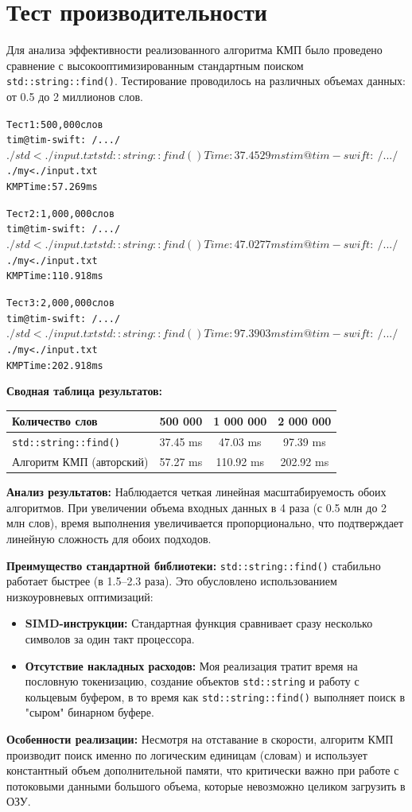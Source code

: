\section{Тест производительности}
Для анализа эффективности реализованного алгоритма КМП было проведено сравнение с высокооптимизированным стандартным поиском \texttt{std::string::find()}. 
Тестирование проводилось на различных объемах данных: от 0.5 до 2 миллионов слов.
\begin{alltt}
    Тест 1: 500,000 слов
    tim@tim-swift:~/.../$ ./std < ./input.txt
    std::string::find() Time: 37.4529 ms
    tim@tim-swift:~/.../$ ./my < ./input.txt
    KMP Time: 57.269 ms
    
    Тест 2: 1,000,000 слов
    tim@tim-swift:~/.../$ ./std < ./input.txt
    std::string::find() Time: 47.0277 ms
    tim@tim-swift:~/.../$ ./my < ./input.txt
    KMP Time: 110.918 ms
    
    Тест 3: 2,000,000 слов
    tim@tim-swift:~/.../$ ./std < ./input.txt
    std::string::find() Time: 97.3903 ms
    tim@tim-swift:~/.../$ ./my < ./input.txt
    KMP Time: 202.918 ms
\end{alltt}

\textbf{Сводная таблица результатов:}

\begin{table}[h!]
    \centering
    \begin{tabular}{|p{5.5cm}|c|c|c|}
        \hline
        Количество слов & 500 000 & 1 000 000 & 2 000 000 \\ \hline
        \texttt{std::string::find()} & 37.45 ms & 47.03 ms & 97.39 ms \\ \hline
        Алгоритм КМП (авторский) & 57.27 ms & 110.92 ms & 202.92 ms \\ \hline
    \end{tabular}
\end{table}
\textbf{Анализ результатов:}
Наблюдается четкая линейная масштабируемость обоих алгоритмов. При увеличении объема входных данных в 4 раза (с 0.5 млн до 2 млн слов), время выполнения увеличивается пропорционально, что подтверждает линейную сложность для обоих подходов.

\textbf{Преимущество стандартной библиотеки:} \texttt{std::string::find()} стабильно работает быстрее (в 1.5--2.3 раза). Это обусловлено использованием низкоуровневых оптимизаций:
\begin{itemize}
    \item \textbf{SIMD-инструкции:} Стандартная функция сравнивает сразу несколько символов за один такт процессора.
    \item \textbf{Отсутствие накладных расходов:} Моя реализация тратит время на пословную токенизацию, создание объектов \texttt{std::string} и работу с кольцевым буфером, в то время как \texttt{std::string::find()} выполняет поиск в "сыром" бинарном буфере.
\end{itemize}
\textbf{Особенности реализации:} Несмотря на отставание в скорости, алгоритм КМП производит поиск именно по логическим единицам (словам) и использует константный объем дополнительной памяти, что критически важно при работе с потоковыми данными большого объема, которые невозможно целиком загрузить в ОЗУ.